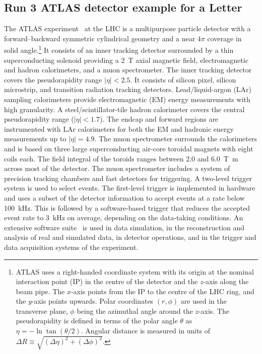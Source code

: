 \newcommand{\AtlasCoordFootnote}{%
ATLAS uses a right-handed coordinate system with its origin at the nominal interaction point (IP)
in the centre of the detector and the \(z\)-axis along the beam pipe.
The \(x\)-axis points from the IP to the centre of the LHC ring,
and the \(y\)-axis points upwards.
Polar coordinates \((r,\phi)\) are used in the transverse plane, 
\(\phi\) being the azimuthal angle around the \(z\)-axis.
The pseudorapidity is defined in terms of the polar angle \(\theta\) as \(\eta = -\ln \tan(\theta/2)\).
Angular distance is measured in units of \(\Delta R \equiv \sqrt{(\Delta\eta)^{2} + (\Delta\phi)^{2}}\).}

\subsection{Run 3 ATLAS detector example for a Letter}
\label{sec:atlas3a}

The ATLAS experiment~\cite{PERF-2007-01,GENR-2019-02} at the LHC is a multipurpose particle detector
with a forward--backward symmetric cylindrical geometry and a near \(4\pi\) coverage in 
solid angle.\footnote{\AtlasCoordFootnote}
It consists of an inner tracking detector surrounded by a thin superconducting solenoid
providing a \qty{2}{\tesla} axial magnetic field, electromagnetic and hadron calorimeters, and a muon spectrometer.
The inner tracking detector covers the pseudorapidity range \(|\eta| < 2.5\).
It consists of silicon pixel, silicon microstrip, and transition radiation tracking detectors.
Lead/liquid-argon (LAr) sampling calorimeters provide electromagnetic (EM) energy measurements
with high granularity.
A steel/scintillator-tile hadron calorimeter covers the central pseudorapidity range (\(|\eta| < 1.7\)).
The endcap and forward regions are instrumented with LAr calorimeters
for both the EM and hadronic energy measurements up to \(|\eta| = 4.9\).
The muon spectrometer surrounds the calorimeters and is based on
three large superconducting air-core toroidal magnets with eight coils each.
The field integral of the toroids ranges between \num{2.0} and \qty{6.0}{\tesla\metre}
across most of the detector. 
The muon spectrometer includes a system of precision tracking chambers and fast detectors for triggering.
A two-level trigger system is used to select events.
The first-level trigger is implemented in hardware and uses a subset of the detector information
to accept events at a rate below \qty{100}{\kHz}.
This is followed by a software-based trigger that
reduces the accepted event rate to \qty{3}{\kHz} on average,
depending on the data-taking conditions.
An extensive software suite~\cite{ATL-SOFT-PUB-2021-001} is used in data simulation, in the reconstruction
and analysis of real and simulated data, in detector operations, and in the trigger and data acquisition
systems of the experiment.


